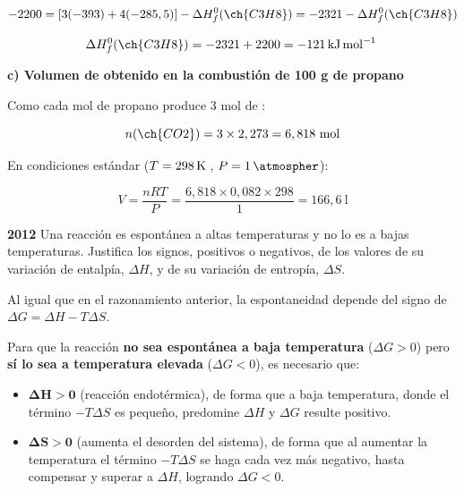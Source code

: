 \begin{exerciseEVAU}
\begin{solu}
        \begin{equation*}
            -2200 = \left[ 3(-393) + 4(-285,5) \right] - \Delta H^0_f (\ch{C3H8}) = -2321 - \Delta H^0_f (\ch{C3H8})
        \end{equation*}

        \begin{equation*}
            \Delta H^0_f (\ch{C3H8}) = -2321 + 2200 = \energia[kjmol]{-121}
        \end{equation*}

        \textbf{c) Volumen de  obtenido en la combustión de 100 g de propano}

        Como cada mol de propano produce 3 mol de :

        \begin{equation*}
            n(\ch{CO2}) = 3 \times 2,273 = 6,818 \ \text{mol}
        \end{equation*}

        En condiciones estándar (\(T = \temperatura[k]{298}\), \(P = \SI{1}{\atmospher}\)):

        \begin{equation*}
            V = \dfrac{nRT}{P} = \dfrac{6,818 \times 0,082 \times 298}{1} = 166,6 \ \si{\litre}
        \end{equation*}

    \end{solu}
\end{exerciseEVAU}

\begin{exerciseEVAU}
    \textbf{2012} Una reacción es espontánea a altas temperaturas y no lo es a bajas temperaturas. Justifica los signos, positivos o negativos, de los valores de su variación de entalpía, \(\Delta H\), y de su variación de entropía, \(\Delta S\).

    \begin{solu}

        Al igual que en el razonamiento anterior, la espontaneidad depende del signo de \(\Delta G = \Delta H - T \Delta S\).

        Para que la reacción \textbf{no sea espontánea a baja temperatura} (\(\Delta G > 0\)) pero \textbf{sí lo sea a temperatura elevada} (\(\Delta G < 0\)), es necesario que:

        \begin{itemize}
            \item \(\boldsymbol{\Delta H > 0}\) (reacción endotérmica), de forma que a baja temperatura, donde el término \(-T\Delta S\) es pequeño, predomine \(\Delta H\) y \(\Delta G\) resulte positivo.
            \item \(\boldsymbol{\Delta S > 0}\) (aumenta el desorden del sistema), de forma que al aumentar la temperatura el término \(-T\Delta S\) se haga cada vez más negativo, hasta compensar y superar a \(\Delta H\), logrando \(\Delta G < 0\).
        \end{itemize}

    \end{solu}
\end{exerciseEVAU}

